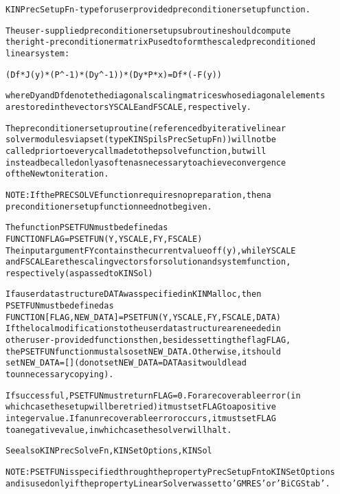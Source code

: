 \begin{alltt}
KINPrecSetupFn - type for user provided preconditioner setup function.

   The user-supplied preconditioner setup subroutine should compute 
   the right-preconditioner matrix P used to form the scaled preconditioned 
   linear system:

   (Df*J(y)*(P^-1)*(Dy^-1)) * (Dy*P*x) = Df*(-F(y))

   where Dy and Df denote the diagonal scaling matrices whose diagonal elements 
   are stored in the vectors YSCALE and FSCALE, respectively.

   The preconditioner setup routine (referenced by iterative linear
   solver modules via pset (type KINSpilsPrecSetupFn)) will not be
   called prior to every call made to the psolve function, but will
   instead be called only as often as necessary to achieve convergence
   of the Newton iteration.

   NOTE: If the PRECSOLVE function requires no preparation, then a
   preconditioner setup function need not be given.

   The function PSETFUN must be defined as 
        FUNCTION FLAG = PSETFUN(Y, YSCALE, FY, FSCALE)
   The input argument FY contains the current value of f(y), while YSCALE
   and FSCALE are the scaling vectors for solution and system function,
   respectively (as passed to KINSol)

   If a user data structure DATA was specified in KINMalloc, then
   PSETFUN must be defined as
        FUNCTION [FLAG, NEW_DATA] = PSETFUN(Y, YSCALE, FY, FSCALE, DATA)
   If the local modifications to the user data structure are needed in
   other user-provided functions then, besides setting the flag FLAG,
   the PSETFUN function must also set NEW_DATA. Otherwise, it should 
   set NEW_DATA=[] (do not set NEW_DATA = DATA as it would lead
   to unnecessary copying).

   If successful, PSETFUN must return FLAG=0. For a recoverable error (in    
   which case the setup will be retried) it must set FLAG to a positive
   integer value. If an unrecoverable error occurs, it must set FLAG
   to a negative value, in which case the solver will halt.

   See also KINPrecSolveFn, KINSetOptions, KINSol

   NOTE: PSETFUN is specified through the property PrecSetupFn to KINSetOptions
   and is used only if the property LinearSolver was set to 'GMRES' or 'BiCGStab'.
\end{alltt}






\vspace{0.1in}